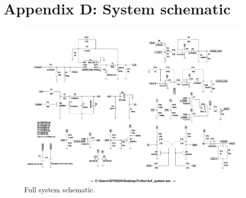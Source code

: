 \chapter{Appendix D: System schematic}

\begin{figure}[h]
  \centering
 \footnotesize
        \includegraphics[angle=270, width=0.8\linewidth]{./Figures/full_system.pdf}
    		    \caption{Full system schematic.} \label{fig:full_circuit_diagram}
 \end{figure}